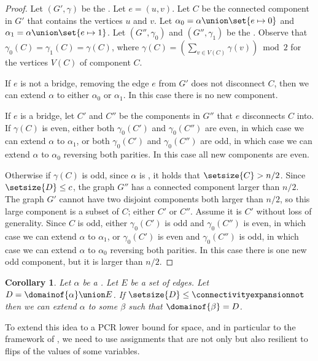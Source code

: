 \documentclass[11pt]{article}
\numberwithin{equation}{section}
\newtheorem{corollary}[theorem]{Corollary}
\theoremstyle{definition}
\theoremstyle{plain}
\begin{document}
\begin{proof}
  Let $(G',\gamma)$ be the \inducedgraph{$\alpha$}. Let $e=(u,v)$. Let $C$ be the connected component in $G'$ that contains the vertices $u$ and $v$. Let $\alpha_0=\alpha\union\set{e\mapsto 0}$ and $\alpha_1=\alpha\union\set{e\mapsto 1}$. Let $(G'',\gamma_0)$ and $(G'',\gamma_1)$ be the . Observe that $\gamma_0(C)=\gamma_1(C)=\gamma(C)$, where $\gamma(C) = \left(\sum_{v \in V(C)} \gamma(v)\right) \bmod 2$ for the vertices $V(C)$ of component $C$.

If $e$ is not a bridge, \ieComma removing the edge $e$ from $G'$ does not disconnect $C$, then we can extend $\alpha$ to either $\alpha_0$ or $\alpha_1$. In this case there is no new component.

If $e$ is a bridge, let $C'$ and $C''$ be the components in $G''$ that $e$ disconnects $C$ into. If $\gamma(C)$ is even, either both $\gamma_0(C')$ and $\gamma_0(C'')$ are even, in which case we can extend $\alpha$ to $\alpha_1$, or both $\gamma_0(C')$ and $\gamma_0(C'')$ are odd, in which case we can extend $\alpha$ to $\alpha_0$ reversing both parities. In this case all new components are even.

Otherwise if $\gamma(C)$ is odd, since $\alpha$ is \nonsplitting, it holds that $\setsize{C}>n/2$. Since $\setsize{D}\leq c$, the graph $G''$ has a connected component larger than $n/2$. The graph $G'$ cannot have two disjoint components both larger than $n/2$, so this large component is a subset of $C$; either $C'$ or $C''$. Assume it is $C'$ without loss of generality. Since $C$ is odd, either $\gamma_0(C')$ is odd and $\gamma_0(C'')$ is even, in which case we can extend $\alpha$ to $\alpha_1$, or $\gamma_0(C')$ is even and $\gamma_0(C'')$ is odd, in which case we can extend $\alpha$ to $\alpha_0$ reversing both parities. In this case there is one new odd component, but it is larger than $n/2$.
\end{proof}
\begin{corollary}
  \label{cor:extend-non-splitting}
  Let $\alpha$ be a \nonsplittingassignment. Let $E$ be a set of edges. Let $D=\domainof{\alpha}\union E$. If $\setsize{D}\leq \connectivityexpansionnot$ then we can extend $\alpha$ to some \nonsplittingassignment $\beta$ such that $\domainof{\beta}=D$.
\end{corollary}

To extend this idea to a PCR lower bound for space, and in particular to the framework of \cite{BG15Framework}, we need to use assignments that are not only \nonsplitting{} but also resilient to flips of the values of some variables.
\end{document}
